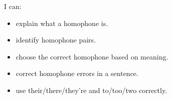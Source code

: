 \begin{selfcheck}
I can:
\begin{itemize}
    \item explain what a homophone is.
    \item identify homophone pairs.
    \item choose the correct homophone based on meaning.
    \item correct homophone errors in a sentence.
    \item use their/there/they're and to/too/two correctly.
\end{itemize}
\end{selfcheck}

